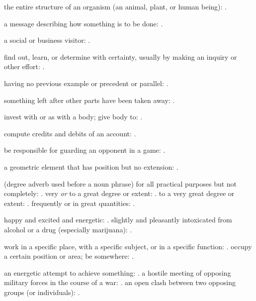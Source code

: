   the entire structure of an organism (an animal, plant, or human being):   .

  a message describing how something is to be done:   .

  a social or business visitor:   .

  find out, learn, or determine with certainty, usually by making an inquiry or other effort:   .

  having no previous example or precedent or parallel:   .

  something left after other parts have been taken away:   .

  invest with or as with a body; give body to:   .

  compute credits and debits of an account: .

  be responsible for guarding an opponent in a game: .

  a geometric element that has position but no extension: .

  (degree adverb used before a noun phrase) for all practical purposes but not completely:   . very \textit{or} to a great degree or extent: . to a very great degree or extent:   . frequently or in great quantities:   .

  happy and excited and energetic:   . slightly and pleasantly intoxicated from alcohol or a drug (especially marijuana):   .

  work in a specific place, with a specific subject, or in a specific function:   . occupy a certain position or area; be somewhere: .

  an energetic attempt to achieve something:   . a hostile meeting of opposing military forces in the course of a war:   . an open clash between two opposing groups (or individuals):   .

